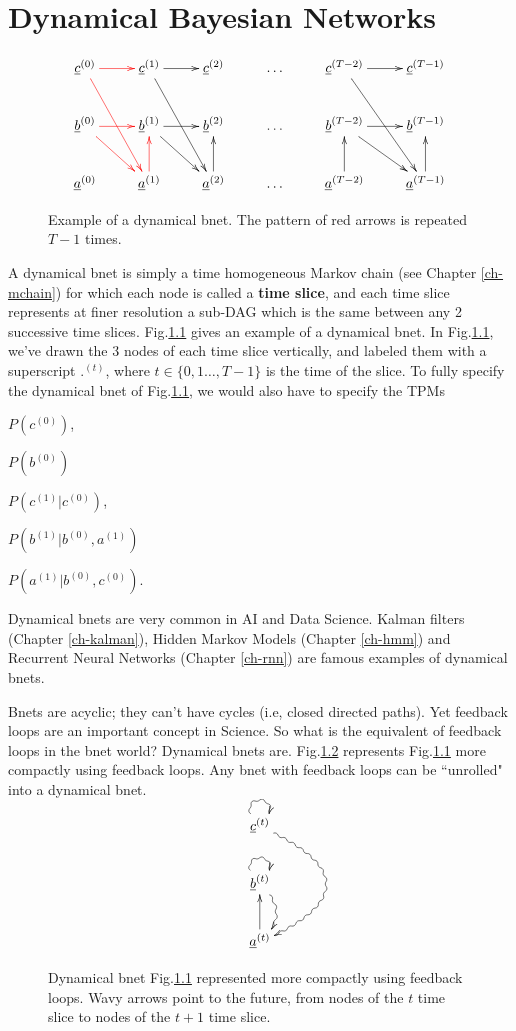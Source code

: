 \chapter{Dynamical Bayesian Networks}
\label{ch-dyn-bnet}

\begin{figure}[h!]
$$
\xymatrix{
\rvc^{(0)}\ar@[red][r]\ar@[red][rdd]
&\rvc^{(1)}\ar[r]\ar[rdd]
&\rvc^{(2)}
&\ldots
&\rvc^{(T-2)}\ar[r]\ar[rdd]
&\rvc^{(T-1)}
\\
\rvb^{(0)}\ar@[red][rd]\ar@[red][r]
&\rvb^{(1)}\ar[rd]\ar[r]
&\rvb^{(2)}
&\ldots
&\rvb^{(T-2)}\ar[rd]\ar[r]
&\rvb^{(T-1)}
\\
\rva^{(0)}
&\rva^{(1)}\ar@[red][u]
&\rva^{(2)}\ar[u]
&\ldots
&\rva^{(T-2)}\ar[u]
&\rva^{(T-1)}\ar[u]
}$$
\caption{
Example of a dynamical bnet. The
pattern of red arrows is repeated $T-1$ times.
}
\label{fig-dyn-bnet}
\end{figure}



A dynamical bnet is simply
a time homogeneous Markov chain (see Chapter
\ref{ch-mchain})
for which each node is 
called a {\bf time slice},
and each time slice 
represents
at finer resolution a sub-DAG
which is the same 
between any
2 successive time slices.
Fig.\ref{fig-dyn-bnet} gives an example
of a dynamical bnet.
In Fig.\ref{fig-dyn-bnet},
we've drawn the 3 nodes of
each time slice vertically,
and labeled them
with a superscript ${.}^{(t)}$,
where $t\in \{
0,1 \ldots, T-1\}$ 
is the time
of the slice.
To fully 
specify the
dynamical bnet
of Fig.\ref{fig-dyn-bnet},
we would also have to specify
the TPMs 

$P(c^{(0)})$, 

$P(b^{(0)})$

$P(c^{(1)}|c^{(0)})$,
 
$P(b^{(1)}|b^{(0)}, a^{(1)})$

$P(a^{(1)}|b^{(0)}, c^{(0)})$.

Dynamical bnets
are very common
in AI and Data Science.
Kalman filters (Chapter \ref{ch-kalman}),
Hidden Markov Models (Chapter \ref{ch-hmm})
and
Recurrent Neural Networks 
(Chapter \ref{ch-rnn})
are famous examples of dynamical bnets.

Bnets are acyclic; they can't have cycles
(i.e, closed directed paths).
Yet feedback loops are an important
concept in Science. So what is
the equivalent of feedback loops in the
bnet world? Dynamical bnets are.
Fig.\ref{fig-dyn-bnet-compact}
represents
Fig.\ref{fig-dyn-bnet} more 
compactly using feedback loops. 
Any bnet with feedback loops
can be ``unrolled" into a dynamical bnet.


\begin{figure}[h!]
$$
\xymatrix{
\rvc^{(t)}
\ar@/^4pc/@{~>}[dd]
\ar@(ul,ur)@{~>}[]
\\
\rvb^{(t)}
\ar@/^1pc/@{~>}[d]
\ar@(ul,ur)@{~>}[]
\\
\rva^{(t)}\ar[u]
}$$
\caption{
Dynamical bnet Fig.\ref{fig-dyn-bnet}
represented 
more compactly using feedback loops.
Wavy arrows
point to the future, from nodes of the $t$ time slice
to nodes of the $t+1$ time slice.
}
\label{fig-dyn-bnet-compact}
\end{figure}
